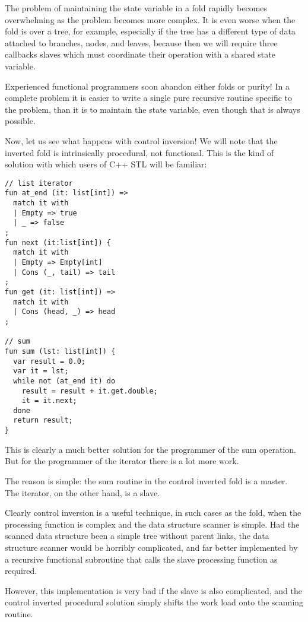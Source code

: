 \documentclass{article}
\begin{document}
The problem of maintaining the state variable in a fold
rapidly becomes overwhelming as the problem becomes more
complex. It is even worse when the fold is over a tree,
for example, especially if the tree has a different type
of data attached to branches, nodes, and leaves, because
then we will require three callbacks slaves which must
coordinate their operation with a shared state variable.

Experienced functional programmers soon abandon either folds
or purity! In a complete problem it is easier to write a
single pure recursive routine specific to the problem,
than it is to maintain the state variable, even though that
is always possible.

Now, let us see what happens with control inversion!
We will note that the inverted fold is intrinsically
procedural, not functional. This is the kind of solution
with which users of C++ STL will be familiar:

\begin{verbatim}
// list iterator
fun at_end (it: list[int]) => 
  match it with
  | Empty => true
  | _ => false
;
fun next (it:list[int]) {
  match it with
  | Empty => Empty[int]
  | Cons (_, tail) => tail
;
fun get (it: list[int]) =>
  match it with
  | Cons (head, _) => head
;

// sum
fun sum (lst: list[int]) {
  var result = 0.0;
  var it = lst;
  while not (at_end it) do
    result = result + it.get.double;
    it = it.next;
  done
  return result;
}
\end{verbatim}

This is clearly a much better solution for the programmer
of the sum operation. But for the programmer of the iterator
there is a lot more work.

The reason is simple: the sum routine in the control inverted
fold is a master. The iterator, on the other hand, is a slave.

Clearly control inversion is a useful technique, in such cases
as the fold, when the processing function is complex and the
data structure scanner is simple. Had the scanned data structure
been a simple tree without parent links, the data structure
scanner would be horribly complicated, and far better implemented
by a recursive functional subroutine that calls the slave
processing function as required. 

However, this implementation
is very bad if the slave is also complicated, 
and the control inverted procedural solution simply
shifts the work load onto the scanning routine.
\end{document}
